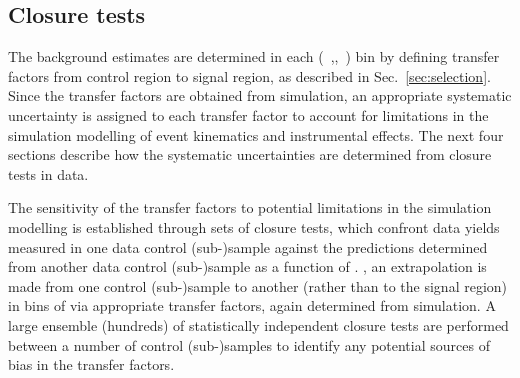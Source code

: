 %

\subsection{Closure tests}
\label{sec:closure-tests-desc}
\label{sec:bkgdnorm-syst}

The background estimates are determined in each (\nb~,\njet,~\scalht) bin by
defining transfer factors from control region to signal region, as
described in Sec.~\ref{sec:selection}. Since the transfer factors
are obtained from simulation, an appropriate systematic uncertainty is
assigned to each transfer factor to account for limitations in the
simulation modelling of event kinematics and instrumental effects. The
next four sections describe how the systematic uncertainties are
determined from closure tests in data.

The sensitivity of the transfer factors to potential limitations in
the simulation modelling is established through sets of closure tests,
which confront data yields measured in one data control (sub-)sample
against the predictions determined from another data control
(sub-)sample as a function of \scalht. \ie, an extrapolation is made
from one control (sub-)sample to another (rather than to the signal
region) in bins of \scalht via appropriate transfer factors, again
determined from simulation. A large ensemble (\ie hundreds) of
statistically independent closure tests are performed between a number
of control (sub-)samples to identify any potential sources of bias in
the transfer factors.


